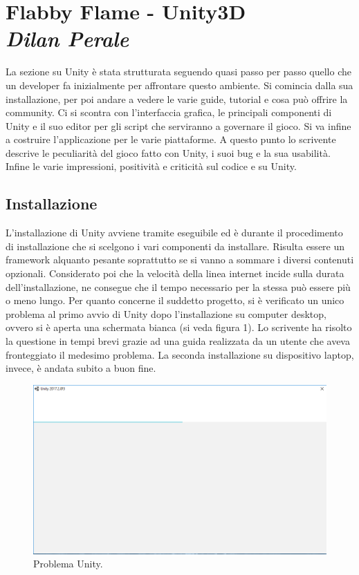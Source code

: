 
\newpage
\section{Flabby Flame - Unity3D\\{\small \emph{Dilan Perale}}}
\label{sec:unity}

La sezione su Unity è stata strutturata seguendo quasi passo per passo quello che un developer fa inizialmente per affrontare questo ambiente. Si comincia dalla sua installazione, per poi andare a vedere le varie guide, tutorial e cosa può offrire la community. Ci si scontra con l'interfaccia grafica, le principali componenti di Unity e il suo editor per gli script che serviranno a governare il gioco. Si va infine a costruire l'applicazione per le varie piattaforme. A questo punto lo scrivente descrive le peculiarità del gioco fatto con Unity, i suoi bug e la sua usabilità. Infine le varie impressioni, positività e criticità sul codice e su Unity.

\subsection{Installazione}

L’installazione di Unity avviene tramite eseguibile ed è durante il procedimento di installazione che si scelgono i vari componenti da installare. Risulta essere un framework alquanto pesante soprattutto se si vanno a sommare i diversi contenuti opzionali. Considerato poi che la velocità della linea internet incide sulla durata dell’installazione, ne consegue che il tempo necessario per la stessa può essere più o meno lungo.
Per quanto concerne il suddetto progetto, si è verificato un unico problema al primo avvio di Unity dopo l’installazione su computer desktop, ovvero si è aperta una schermata bianca (si veda figura 1). Lo scrivente ha risolto la questione in tempi brevi grazie ad una guida realizzata da un utente che aveva fronteggiato il medesimo problema. La seconda installazione su dispositivo laptop, invece, è andata subito a buon fine.

\begin{figure}[h]
\centering
\includegraphics [width=\textwidth]{img/unity_problem.png}
\caption{\label{fig:problem} Problema Unity.}
\end{figure}


